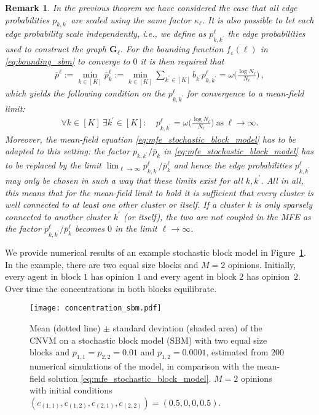 \documentclass[a4paper,
               10pt,
               pdftex,
               normalheadings,
               headsepline,
               footsepline,
               headinclude,
               footinclude,
               DIV=14,
               abstracton]
{scrartcl}
\newtheorem{remark}[theorem]{Remark}
\newcommand{\rv}[1]{\bm{#1}}
\newcommand{\review}[1]{{#1}}
\begin{document}
\begin{remark}
In the previous theorem we have considered the case that all edge probabilities $p_{k,k^\prime}$ are scaled using the same factor $\kappa_\ell$.
It is also possible to let each edge probability scale independently, i.e., we define as $p^\ell_{k,k^\prime}$ the edge probabilities used to construct the graph $\rv{G}_\ell$.
For the bounding function $f_\varepsilon(\ell)$ in \eqref{eq:bounding_sbm} to converge to $0$ it is then required that 
\begin{align}
    \bar{p}^\ell := \min_{k\in[K]} \bar{p}_k^\ell := \min_{k\in[K]} \sum_{k^\prime \in [K]} b_{k^\prime} p_{k,k^\prime}^\ell = \omega\Big(\frac{\log N_\ell}{N_\ell}\Big) \, ,
\end{align}
which yields the following condition on the $p^\ell_{k,k^\prime}$ for convergence to a mean-field limit:
\begin{align}
    \forall k \in [K]\ \exists k^\prime \in [K]:\quad p^\ell_{k,k^\prime} = \omega\Big(\frac{\log N_\ell}{N_\ell}\Big) \ \text{as}\ \ell \to \infty.
\end{align}
Moreover, the mean-field equation \eqref{eq:mfe_stochastic_block_model} has to be adapted to this setting: the factor $p_{k,k^\prime} / \bar{p}_k$ in \eqref{eq:mfe_stochastic_block_model} has to be replaced by the limit $\lim_{\ell \to \infty} p^\ell_{k,k^\prime}/\bar{p}_k^\ell$ and hence the edge probabilities $p^\ell_{k,k^\prime}$ may only be chosen in such a way that these limits exist for all $k,k^\prime$.
All in all, this means that for the mean-field limit to hold it is sufficient that every cluster is well connected to at least one other cluster or itself. If a cluster $k$ is only sparsely connected to another cluster $k^\prime$ (or itself), the two are not coupled in the MFE as the factor $p^\ell_{k,k^\prime}/\bar{p}_k^\ell$ becomes $0$ in the limit $\ell \to \infty$.
\end{remark}

We provide numerical results of an example stochastic block model in Figure~\ref{fig:concentration_sbm}.
In the example, there are two equal size blocks and $M=2$ opinions. Initially, every agent in block $1$ has opinion $1$ and every agent in block $2$ has opinion~$2$. Over time the concentrations in both blocks equilibrate.

\begin{figure}
    \centering
    \texttt{[image: concentration\_sbm.pdf]}
    \caption{Mean (dotted line) $\pm$ standard deviation (shaded area) of the CNVM on a stochastic block model (SBM) with two equal size blocks and $p_{1,1}= p_{2,2} = 0.01$ and $p_{1,2} = 0.0001$, estimated from $200$ \review{numerical simulations of the model}, in comparison with the mean-field solution \eqref{eq:mfe_stochastic_block_model}. $M=2$ opinions with initial conditions $(c_{(1,1)}, c_{(1,2)}, c_{(2,1)}, c_{(2,2)}) = (0.5, 0, 0, 0.5)$.}
    \label{fig:concentration_sbm}
\end{figure}
\end{document}
